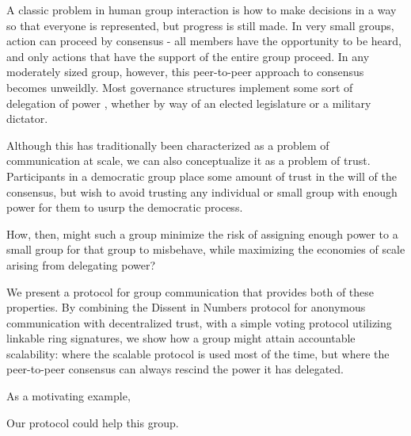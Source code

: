 %
A classic problem in human group interaction is how to make decisions in a way
so that everyone is represented, but progress is still made. In very small
groups, action can proceed by consensus - all members have the opportunity to be
heard, and only actions that have the support of the entire group proceed. In
any moderately sized group, however, this peer-to-peer approach to consensus
becomes unweildly. Most governance structures implement some sort of delegation
of power , whether by way of an elected legislature or a military
dictator.

Although this has traditionally been characterized as a problem of communication
at scale, we can also conceptualize it as a problem of trust. Participants in a
democratic group place some amount of trust in the will of the consensus, but
wish to avoid trusting any individual or small group with enough power for them
to usurp the democratic process.

How, then, might such a group minimize the risk of assigning enough power to a
small group for that group to misbehave, while maximizing the economies of scale
arising from delegating power?

We present a protocol for group communication that provides both of these
properties. By combining the Dissent in Numbers protocol for anonymous
communication with decentralized trust, with a simple voting protocol utilizing
linkable ring signatures, we show how a group might attain accountable
scalability: where the scalable protocol is used most of the time, but where
the peer-to-peer consensus can always rescind the power it has
delegated.

As a motivating example, 

Our protocol could help this group.



